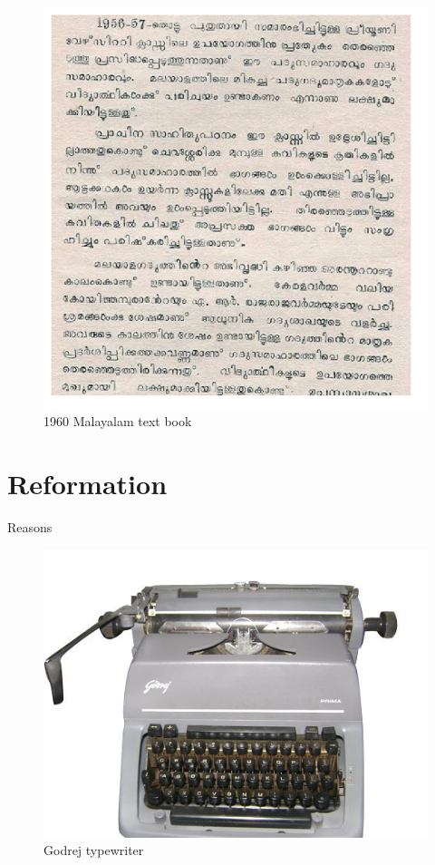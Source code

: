 \documentclass[10pt]{article}
\begin{document}
\begin{figure}[h]
  \centering
   \includegraphics[width=1.0\textwidth]{images/1960-Textbook.png}
     \caption{1960 Malayalam text book}
\end{figure}


\section{Reformation}
Reasons
\begin{figure}
  \centering
   \includegraphics[width=1.0\textwidth]{images/godrej-typewriter.jpg}
     \caption{Godrej typewriter}
\end{figure}
\end{document}
